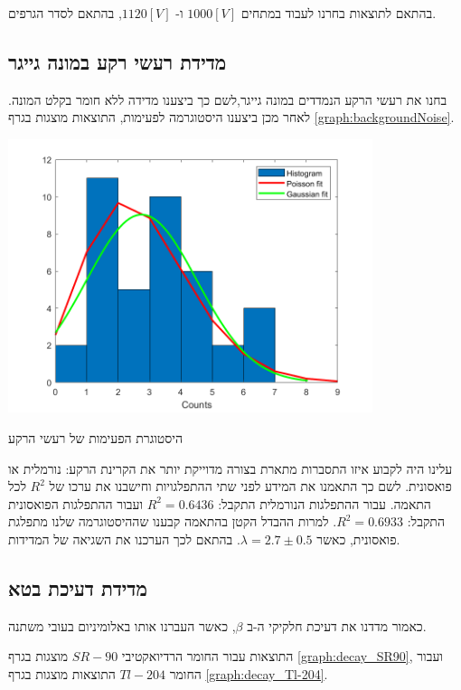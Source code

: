 \documentclass{article}
\begin{document}
בהתאם לתוצאות בחרנו לעבוד במתחים 
$1000[V]$
ו-
$1120[V]$,
בהתאם לסדר הגרפים.

\subsection{
מדידת רעשי רקע במונה גייגר
}
בחנו את רעשי הרקע הנמדדים במונה גייגר,לשם כך ביצענו מדידה ללא חומר בקלט המונה. לאחר מכן ביצענו היסטוגרמה לפעימות, התוצאות מוצגות בגרף
\ref{graph:backgroundNoise}.

\begin{graph}[ht!]
    \centering
    \includegraphics[width=0.8\textwidth]{hist.png}
    \caption{
    היסטוגרת הפעימות של רעשי הרקע
    }
    \label{graph:backgroundNoise}
\end{graph}
עלינו היה לקבוע איזו התסברות מתארת בצורה מדוייקת יותר את הקרינת הרקע: נורמלית או פואסונית.
לשם כך התאמנו את המידע לפני שתי ההתפלגויות וחישבנו את ערכו של 
$R^2$
לכל התאמה.
עבור ההתפלגות הנורמלית התקבל:
$R^2 = 0.6436$
ועבור ההתפלגות הפואסונית התקבל:
$R^2 = 0.6933$.
למרות ההבדל הקטן בהתאמה קבענו שההיסטוגרמה שלנו מתפלגת פואסונית, כאשר
$\lambda = 2.7 \pm 0.5$.
בהתאם לכך הערכנו את השגיאה של המדידות.
\subsection{
מדידת דעיכת בטא
}

כאמור מדדנו את דעיכת חלקיקי ה-ב
$\beta$,
כאשר העברנו אותו באלומיניום בעובי משתנה.

התוצאות עבור החומר הרדיואקטיבי
$SR-90$
מוצגות בגרף 
\ref{graph:decay_SR90},
ועבור החומר
$Tl-204$
התוצאות מוצגות בגרף
\ref{graph:decay_Tl-204}.
\end{document}
